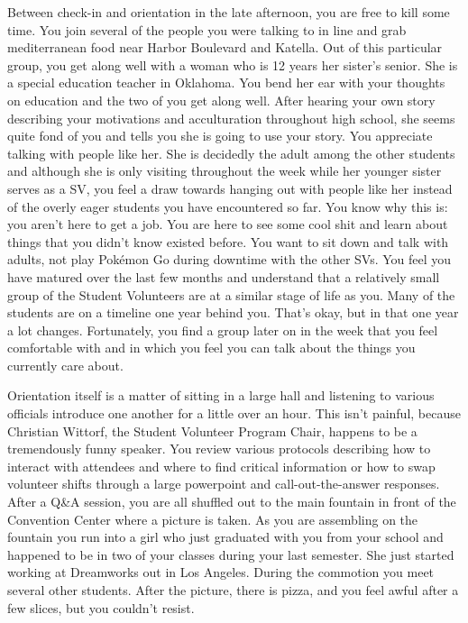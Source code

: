 \documentclass[../main.tex]{subfiles}
\begin{document}
Between check-in and orientation in the late afternoon, you are free to kill some time. You join several of the people you were talking to in line and grab mediterranean food near Harbor Boulevard and Katella. Out of this particular group, you get along well with a woman who is 12 years her sister's senior. She is a special education teacher in Oklahoma. You bend her ear with your thoughts on education and the two of you get along well. After hearing your own story describing your motivations and acculturation throughout high school, she seems quite fond of you and tells you she is going to use your story. You appreciate talking with people like her. She is decidedly the adult among the other students and although she is only visiting throughout the week while her younger sister serves as a SV, you feel a draw towards hanging out with people like her instead of the overly eager students you have encountered so far. You know why this is: you aren't here to get a job. You are here to see some cool shit and learn about things that you didn't know existed before. You want to sit down and talk with adults, not play Pokémon Go during downtime with the other SVs. You feel you have matured over the last few months and understand that a relatively small group of the Student Volunteers are at a similar stage of life as you. Many of the students are on a timeline one year behind you. That's okay, but in that one year a lot changes. Fortunately, you find a group later on in the week that you feel comfortable with and in which you feel you can talk about the things you currently care about.

Orientation itself is a matter of sitting in a large hall and listening to various officials introduce one another for a little over an hour. This isn't painful, because Christian Wittorf, the Student Volunteer Program Chair, happens to be a tremendously funny speaker. You review various protocols describing how to interact with attendees and where to find critical information or how to swap volunteer shifts through a large powerpoint and call-out-the-answer responses. After a Q\&A session, you are all shuffled out to the main fountain in front of the Convention Center where a picture is taken. As you are assembling on the fountain you run into a girl who just graduated with you from your school and happened to be in two of your classes during your last semester. She just started working at Dreamworks out in Los Angeles. During the commotion you meet several other students. After the picture, there is pizza, and you feel awful after a few slices, but you couldn't resist.
\end{document}
